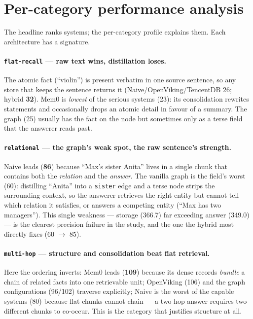 \documentclass[11pt]{article}
\newcommand{\best}[1]{\textbf{#1}}
\begin{document}
\section{Per-category performance analysis}\label{sec:analysis}

The headline ranks systems; the per-category profile explains them. Each architecture has a signature.

\paragraph{\texttt{flat-recall} --- raw text wins, distillation loses.}
The atomic fact (``violin'') is present verbatim in one source sentence, so any store that keeps the sentence
returns it (Naive/OpenViking/TencentDB 26; hybrid \best{32}). Mem0 is \emph{lowest} of the serious systems
(23): its consolidation rewrites statements and occasionally drops an atomic detail in favour of a summary.
The graph (25) usually has the fact on the node but sometimes only as a terse field that the answerer reads
past.

\paragraph{\texttt{relational} --- the graph's weak spot, the raw sentence's strength.}
Naive leads (\best{86}) because ``Max's sister Anita'' lives in a single chunk that contains both the
\emph{relation} and the \emph{answer}. The vanilla graph is the field's worst (60): distilling ``Anita'' into a
\texttt{sister} edge and a terse node strips the surrounding context, so the answerer retrieves the right
entity but cannot tell which relation it satisfies, or answers a competing entity (``Max has two managers'').
This single weakness --- storage (366.7) far exceeding answer (349.0) --- is the clearest precision failure in
the study, and the one the hybrid most directly fixes (60 $\to$ 85).

\paragraph{\texttt{multi-hop} --- structure and consolidation beat flat retrieval.}
Here the ordering inverts: Mem0 leads (\best{109}) because its dense records \emph{bundle} a chain of related
facts into one retrievable unit; OpenViking (106) and the graph configurations (96/102) traverse explicitly;
Naive is the worst of the capable systems (80) because flat chunks cannot chain --- a two-hop answer requires
two different chunks to co-occur. This is the category that justifies structure at all.
\end{document}
